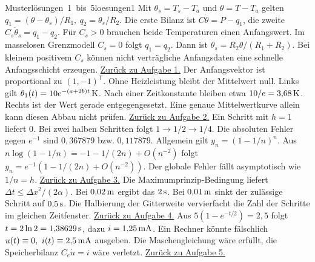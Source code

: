 \unit{Musterlösungen 1 bis 5}{loesungen1}
\hypertarget{loes1}{}
Mit \(\theta_s=T_s-T_a\) und \(\theta=T-T_a\) gelten \(q_1=(\theta-\theta_s)/R_1,\ q_2=\theta_s/R_2\). Die erste Bilanz ist \(C\dot\theta=P-q_1\), die zweite \(C_s\dot\theta_s=q_1-q_2\). Für \(C_s>0\) brauchen beide Temperaturen einen Anfangswert. Im masselosen Grenzmodell \(C_s=0\) folgt \(q_1=q_2\). Dann ist \(\theta_s=R_2\theta/(R_1+R_2)\). Bei kleinem positivem \(C_s\) können nicht verträgliche Anfangsdaten eine schnelle Anfangsschicht erzeugen. \hyperlink{aufgabe1}{Zurück zu Aufgabe 1.}
\hypertarget{loes2}{}
Der Anfangsvektor ist proportional zu \((1,-1)^\mathsf T\). Ohne Heizleistung bleibt der Mittelwert null. Links gilt \(\theta_1(t)=10e^{-(a+2b)t}\,\mathrm{K}\). Nach einer Zeitkonstante bleiben etwa \(10/e=3{,}68\,\mathrm{K}\). Rechts ist der Wert gerade entgegengesetzt. Eine genaue Mittelwertkurve allein kann diesen Abbau nicht prüfen. \hyperlink{aufgabe2}{Zurück zu Aufgabe 2.}
\hypertarget{loes3}{}
Ein Schritt mit \(h=1\) liefert \(0\). Bei zwei halben Schritten folgt \(1\to1/2\to1/4\). Die absoluten Fehler gegen \(e^{-1}\) sind \(0{,}367879\) bzw. \(0{,}117879\). Allgemein gilt \(y_n=(1-1/n)^n\). Aus \(n\log(1-1/n)=-1-1/(2n)+O(n^{-2})\) folgt \(y_n=e^{-1}(1-1/(2n)+O(n^{-2}))\). Der globale Fehler fällt asymptotisch wie \(1/n=h\). \hyperlink{aufgabe3}{Zurück zu Aufgabe 3.}
\hypertarget{loes4}{}
Die Maximumprinzip-Bedingung liefert \(\Delta t\le\Delta x^2/(2\alpha)\). Bei \(0{,}02\,\mathrm{m}\) ergibt das \(2\,\mathrm{s}\). Bei \(0{,}01\,\mathrm{m}\) sinkt der zulässige Schritt auf \(0{,}5\,\mathrm{s}\). Die Halbierung der Gitterweite vervierfacht die Zahl der Schritte im gleichen Zeitfenster. \hyperlink{aufgabe4}{Zurück zu Aufgabe 4.}
\hypertarget{loes5}{}
Aus \(5(1-e^{-t/2})=2{,}5\) folgt \(t=2\ln2=1{,}38629\,\mathrm{s}\), dazu \(i=1{,}25\,\mathrm{mA}\). Ein Rechner könnte fälschlich \(u(t)\equiv0,\ i(t)\equiv2{,}5\unitm{mA}\) ausgeben. Die Maschengleichung wäre erfüllt, die Speicherbilanz \(C_e\dot u=i\) wäre verletzt. \hyperlink{aufgabe5}{Zurück zu Aufgabe 5.}

